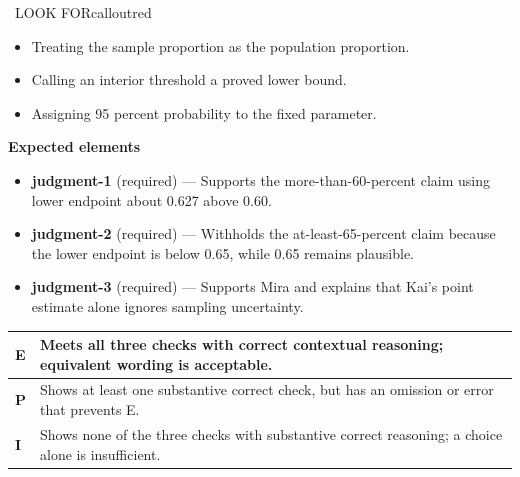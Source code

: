 \documentclass[11pt]{article}
\begin{document}
\begin{callout}{\IconWarn\ LOOK FOR}{calloutred}
\begin{itemize}[leftmargin=1.5em,itemsep=2pt,topsep=2pt]
  \item Treating the sample proportion as the population proportion.
  \item Calling an interior threshold a proved lower bound.
  \item Assigning 95 percent probability to the fixed parameter.
\end{itemize}
\end{callout}


\textbf{Expected elements}
\begin{itemize}[leftmargin=1.5em,itemsep=2pt,topsep=2pt]
  \item \textbf{judgment-1} (required) --- Supports the more-than-60-percent claim using lower endpoint about 0.627 above 0.60.
  \item \textbf{judgment-2} (required) --- Withholds the at-least-65-percent claim because the lower endpoint is below 0.65, while 0.65 remains plausible.
  \item \textbf{judgment-3} (required) --- Supports Mira and explains that Kai's point estimate alone ignores sampling uncertainty.
\end{itemize}

{\small\renewcommand{\arraystretch}{1.25}
\noindent\begin{tabular}{|p{0.5in}|p{5.9in}|}
\hline
\textbf{E} & Meets all three checks with correct contextual reasoning; equivalent wording is acceptable. \\ \hline
\textbf{P} & Shows at least one substantive correct check, but has an omission or error that prevents E. \\ \hline
\textbf{I} & Shows none of the three checks with substantive correct reasoning; a choice alone is insufficient. \\ \hline
\end{tabular}}

\clearpage
{}
\end{document}
